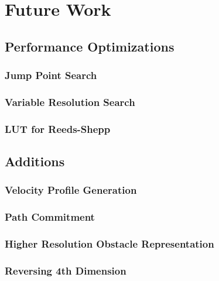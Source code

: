 \chapter{Future Work}

\section{Performance Optimizations}
	\subsection{Jump Point Search}
	\subsection{Variable Resolution Search}
	\subsection{LUT for Reeds-Shepp}
\section{Additions}
	\subsection{Velocity Profile Generation}
	\subsection{Path Commitment}
	\subsection{Higher Resolution Obstacle Representation}
	\subsection{Reversing 4th Dimension}